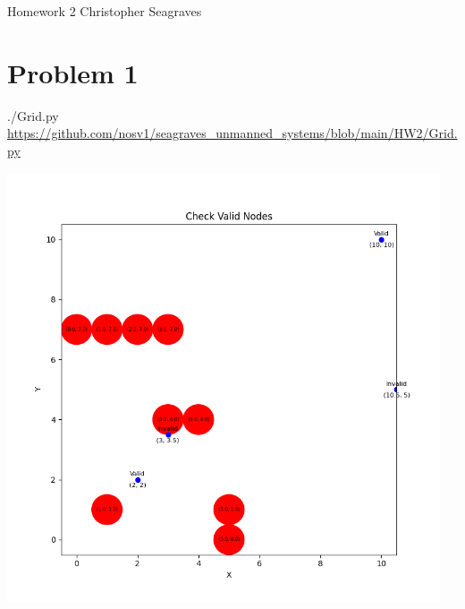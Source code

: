 \documentclass{article}
\begin{document}
    \raggedright
    Homework 2 \break
    Christopher Seagraves

    \section*{Problem 1}
        \begin{minipage}{\linewidth}
            \raggedright
            ./Grid.py \break
            \url{https://github.com/nosv1/seagraves_unmanned_systems/blob/main/HW2/Grid.py}
        \end{minipage}
        \begin{center}
            \includegraphics[height=5in]{HW2P1 Valid Positions.png}
        \end{center}
    
\end{document}
